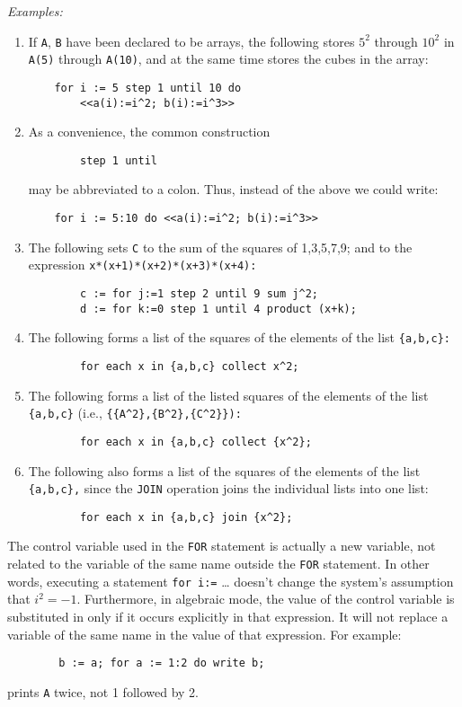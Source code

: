 \textit{Examples:}
\begin{enumerate}
\item If \texttt{A}, \texttt{B} have been declared to be arrays, the following
stores $5^{2}$ through $10^{2}$ in \texttt{A(5)} through \texttt{A(10)}, and at
the same time stores the cubes in the  array:
\begin{verbatim}
    for i := 5 step 1 until 10 do
        <<a(i):=i^2; b(i):=i^3>>
\end{verbatim}
\item As a convenience, the common construction
\begin{verbatim}
        step 1 until
\end{verbatim}
may be abbreviated to a colon. Thus, instead of the above we could write:
\begin{verbatim}
    for i := 5:10 do <<a(i):=i^2; b(i):=i^3>>
\end{verbatim}
\item The following sets \texttt{C} to the sum of the squares of 1,3,5,7,9;
and  to the expression \texttt{x*(x+1)*(x+2)*(x+3)*(x+4):}
\begin{verbatim}
        c := for j:=1 step 2 until 9 sum j^2;
        d := for k:=0 step 1 until 4 product (x+k);
\end{verbatim}
\item The following forms a list of the squares of the elements of the list
\texttt{\{a,b,c\}:}
\begin{verbatim}
        for each x in {a,b,c} collect x^2;
\end{verbatim}
\item The following forms a list of the listed squares of the elements of the
list \texttt{\{a,b,c\}}
(i.e., \texttt{\{\{A\textasciicircum 2\},\{B\textasciicircum 2\},\{C\textasciicircum 2\}\}):}
\begin{verbatim}
        for each x in {a,b,c} collect {x^2};
\end{verbatim}
\item The following also forms a list of the squares of the elements of
the list \texttt{\{a,b,c\},} since the \texttt{JOIN} operation joins the
individual lists into one list:
\begin{verbatim}
        for each x in {a,b,c} join {x^2};
\end{verbatim}
\end{enumerate}
The control variable used in the \texttt{FOR} statement is actually a new
variable, not related to the variable of the same name outside the
\texttt{FOR} statement.  In other words, executing a statement
\texttt{for i:=} \ldots
doesn't change the system's assumption that $i^{2} = -1$.
Furthermore, in algebraic mode, the value of the control variable is
substituted in  only if it occurs explicitly in that
expression.  It will not replace a variable of the same name in the value
of that expression.  For example:
\begin{verbatim}
        b := a; for a := 1:2 do write b;
\end{verbatim}
prints \texttt{A} twice, not 1 followed by 2.

